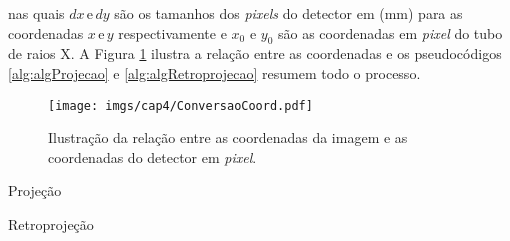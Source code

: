  \noindent nas quais $dx\,\text{e}\,dy$ são os tamanhos dos \textit{pixels} do detector em (mm) para as coordenadas $x\,\text{e}\,y$ respectivamente e $x_{0}$ e $y_{0}$ são as coordenadas em \textit{pixel} do tubo de raios X. A Figura \ref{fig:imgCap4ConversaoCoord} ilustra a relação entre as coordenadas e os pseudocódigos \ref{alg:algProjecao} e \ref{alg:algRetroprojecao} resumem todo o processo.  
 
 \begin{figure}[H]
 	\caption{Ilustração da relação entre as coordenadas da imagem e as coordenadas do detector em \textit{pixel}.}
 	\begin{center}
 		\texttt{[image: imgs/cap4/ConversaoCoord.pdf]}
 	\end{center}
 	\label{fig:imgCap4ConversaoCoord}
\end{figure} 

\begin{algorithm}[H]
	\SetAlgoLined
	\LinesNumberedHidden
	\caption{Projeção}
	\label{alg:algProjecao}	
\end{algorithm}


\begin{algorithm}[H]
	\caption{Retroprojeção}
	\label{alg:algRetroprojecao}
\end{algorithm} 

